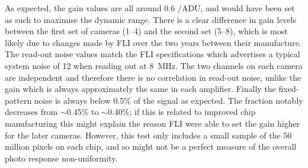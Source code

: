\begin{colsection}
\begin{colsection}
As expected, the gain values are all around 0.6 \elec/ADU, and would have been set as such to maximise the dynamic range. There is a clear difference in gain levels between the first set of cameras (1--4) and the second set (5--8), which is most likely due to changes made by FLI over the two years between their manufacture. The read-out noise values match the FLI specifications which advertises a typical system noise of 12 \elec{} when reading out at \SI{8}{\mega\hertz}. The two channels on each camera are independent and therefore there is no correlation in read-out noise, unlike the gain which is always approximately the same in each amplifier. Finally the fixed-pattern noise is always below 0.5\% of the signal as expected. The fraction notably decreases from $\sim$0.45\% to $\sim$0.40\%; if this is related to improved chip manufacturing this might explain the reason FLI were able to set the gain higher for the later cameras. However, this test only includes a small sample of the 50 million pixels on each chip, and so might not be a perfect measure of the overall photo response non-uniformity.


\end{colsection}
\end{colsection}

